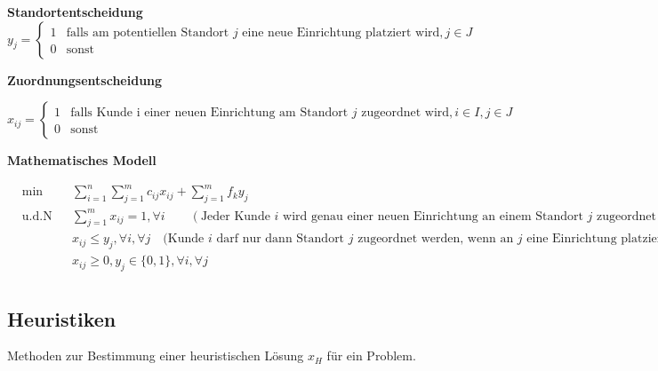       \par \textbf{Standortentscheidung}
      $$
        y_j = 
        \begin{cases}
          1 & \text{falls am potentiellen Standort } j \text{ eine neue Einrichtung platziert wird}, j \in J\\
          0 & \text{sonst}
        \end{cases} 
      $$

      \par \textbf{Zuordnungsentscheidung}
    
      $$
        x_{ij} = 
        \begin{cases}
          1 & \text{falls Kunde i einer neuen Einrichtung am Standort } j \text{ zugeordnet wird}, i \in I, j \in J\\
          0 & \text{sonst}
        \end{cases} 
      $$

      \par \textbf{Mathematisches Modell}

      \begin{equation}
        \begin{aligned}
          & \underset{}{\text{min}}
          && \sum_{i=1}^{n}\sum_{j=1}^{m}c_{ij}x_{ij} + \sum_{j=1}^{m}f_ky_{j}\\
          & \text{u.d.N}
          & & \sum_{j=1}^{m}x_{ij}=1, \forall i \qquad  (\text{Jeder Kunde } i \text{ wird genau einer neuen Einrichtung an einem Standort } j \text{ zugeordnet})\\ 
          & & & x_{ij} \leq y_j, \forall i, \forall j \quad \text{(Kunde } i \text{ darf nur dann Standort } j \text{ zugeordnet werden, wenn an } j \text{ eine Einrichtung platziert)}\\ 
          & & & x_{ij} \geq 0, y_j \in \{0,1\}, \forall i, \forall j \\
        \end{aligned}
      \end{equation}


    \subsection{Heuristiken} %
    \label{sub:heuristiken}

      Methoden zur Bestimmung einer heuristischen Lösung $x_H$ für ein Problem.

